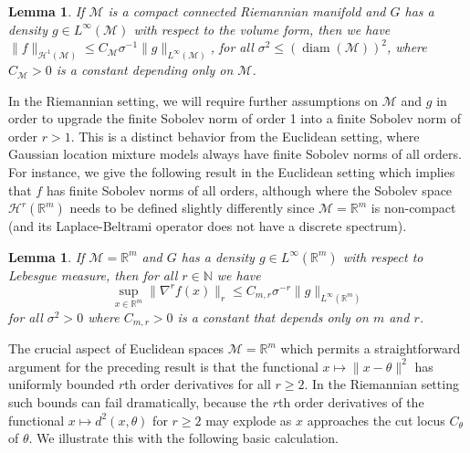 \documentclass[preprint]{imsart}
\theoremstyle{plain}
\newtheorem{lemma}[theorem]{Lemma}
\theoremstyle{definition}
\newcommand{\Rbb}{\mathbb{R}}
\newcommand{\Nbb}{\mathbb{N}}
\newcommand{\Mcal}{\mathcal{M}}
\newcommand{\Hcal}{\mathcal{H}}
\DeclareMathOperator{\diam}{diam}
\begin{document}
\begin{lemma}\label{lem:general-Sobolev}
    If $\Mcal$ is a compact connected Riemannian manifold and $G$ has a density $g\in L^\infty(\Mcal)$ with respect to the volume form, then we have $\|f\|_{\Hcal^1(\Mcal)}\le C_{\Mcal}\sigma^{-1}\|g\|_{L^{\infty}(\Mcal)}$, for all $\sigma^2\le(\diam(\Mcal))^2$, where $C_\Mcal>0$ is a constant depending only on $\Mcal$.
\end{lemma}

In the Riemannian setting, we will require further assumptions on $\Mcal$ and $g$ in order to upgrade the finite Sobolev norm of order 1 into a finite Sobolev norm of order $r>1$.
This is a distinct behavior from the Euclidean setting, where Gaussian location mixture models always have finite Sobolev norms of all orders.
For instance, we give the following result in the Euclidean setting which implies that $f$ has finite Sobolev norms of all orders, although where the Sobolev space $\Hcal^r(\Rbb^m)$ needs to be defined slightly differently since $\Mcal=\Rbb^m$ is non-compact (and its Laplace-Beltrami operator does not have a discrete spectrum).

\begin{lemma}\label{lem:Sobolev-est-Euclidean}
    If $\Mcal=\Rbb^m$ and $G$ has a density $g\in L^{\infty}(\Rbb^m)$ with respect to Lebesgue measure, then for all $r\in\Nbb$ we have
    \begin{equation*}
        \sup_{x\in\Rbb^m}\|\nabla^r f(x)\|_{r} \le C_{m,r}\sigma^{-r}\|g\|_{L^{\infty}(\Rbb^m)}
    \end{equation*}
    for all $\sigma^2>0$ where $C_{m,r}>0$ is a constant that depends only on $m$ and $r$. 
\end{lemma}

The crucial aspect of Euclidean spaces $\Mcal=\Rbb^m$ which permits a straightforward argument for the preceding result is that the functional $x\mapsto \|x-\theta\|^2$ has uniformly bounded $r$th order derivatives for all $r\ge 2$.
In the Riemannian setting such bounds can fail dramatically, because the $r$th order derivatives of the functional $x\mapsto d^2(x,\theta)$ for $r\ge 2$ may explode as $x$ approaches the cut locus $C_{\theta}$ of $\theta$.
We illustrate this with the following basic calculation.
\end{document}
